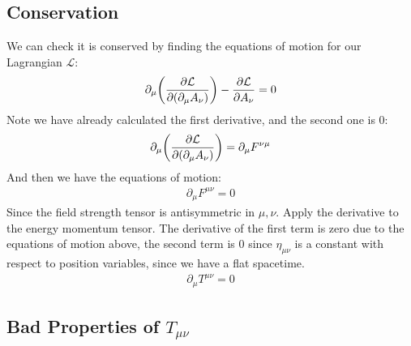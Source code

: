 \documentclass[12pt]{article}
\renewcommand{\L}{\mathcal{L}}
\newcommand{\D}{\partial}
\begin{document}
\subsection{Conservation}
We can check it is conserved by finding the equations of motion for our Lagrangian $\L$:
\begin{align*}
  \D_\mu\qty(\pdv{\L}{(\D_\mu A_\nu)})-\pdv{\L}{A_\nu}=0
\end{align*}
Note we have already calculated the first derivative, and the second one is $0$:
\begin{align*}
  \D_\mu\qty(\pdv{\L}{(\D_\mu A_\nu)})=\D_\mu F^{\nu\mu}
\end{align*}
And then we have the equations of motion:
\begin{align*}
  \D_\mu F^{\mu\nu}=0
\end{align*}
Since the field strength tensor is antisymmetric in $\mu,\nu$. Apply the derivative to the energy momentum tensor. The derivative of the first term is zero due to the equations of motion above, the second term is $0$ since $\eta_{\mu\nu}$ is a constant with respect to position variables, since we have a flat spacetime. 
\begin{align}
  \boxed{\D_\mu T^{\mu\nu}=0}
\end{align}

\subsection{Bad Properties of $T_{\mu\nu}$}
\end{document}
